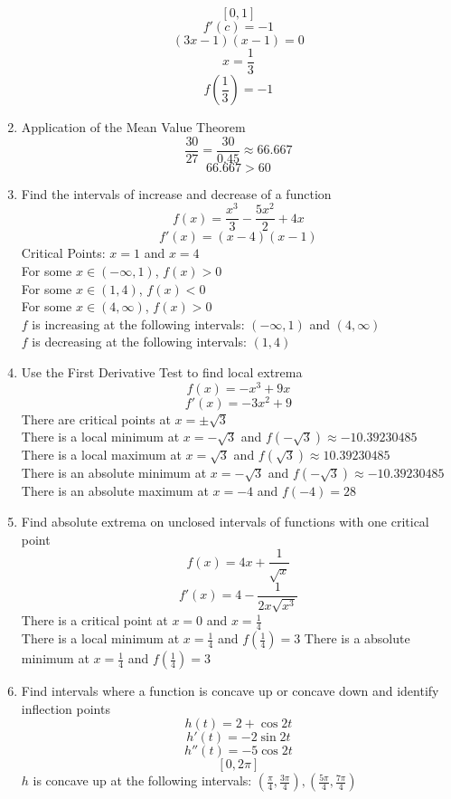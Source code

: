 \documentclass{article}
\begin{document}
\begin{enumerate}
    $$[0, 1]$$
    $$f'(c) = -1$$
    $$(3x - 1)(x - 1) = 0$$
    $$x = \frac{1}{3}$$
    $$f\left(\frac{1}{3}\right) = -1$$
    \item Application of the Mean Value Theorem
    $$\frac{30}{27} = \frac{30}{0.45} \approx 66.667$$
    $$66.667 > 60$$
    \item Find the intervals of increase and decrease of a function
    $$f(x) = \frac{x^3}{3} - \frac{5x^2}{2} + 4x$$
    $$f'(x) = \left(x - 4\right)\left(x - 1\right)$$
    Critical Points: $x = 1$ and $x = 4$ \\
    For some $x \in (-\infty, 1)$, $f(x) > 0$ \\
    For some $x \in (1, 4)$, $f(x) < 0$ \\
    For some $x \in (4, \infty)$, $f(x) > 0$ \\
    $f$ is increasing at the following intervals: $(-\infty, 1)$ and $(4, \infty)$ \\
    $f$ is decreasing at the following intervals: $(1, 4)$
    \item Use the First Derivative Test to find local extrema
    $$f(x) = -x^3 + 9x$$
    $$f'(x) = -3x^2 + 9$$
    There are critical points at $x = \pm \sqrt{3}$ \\
    There is a local minimum at $x = -\sqrt{3}$ and $f(-\sqrt{3}) \approx -10.39230485$ \\
    There is a local maximum at $x = \sqrt{3}$ and $f(\sqrt{3}) \approx 10.39230485$ \\
    There is an absolute minimum at $x = -\sqrt{3}$ and $f(-\sqrt{3}) \approx -10.39230485$ \\
    There is an absolute maximum at $x = -4$ and $f(-4) = 28$
    \item Find absolute extrema on unclosed intervals of functions with one critical point
    $$f(x) = 4x + \frac{1}{\sqrt{x}}$$
    $$f'(x) = 4 - \frac{1}{2x\sqrt{x^3}}$$
    There is a critical point at $x = 0$ and $x = \frac{1}{4}$ \\
    There is a local minimum at $x = \frac{1}{4}$ and $f\left(\frac{1}{4}\right) = 3$
    There is a absolute minimum at $x = \frac{1}{4}$ and $f\left(\frac{1}{4}\right) = 3$
    \item Find intervals where a function is concave up or concave down and identify inflection points
    $$h(t) = 2 + \cos{2t}$$
    $$h'(t) = -2\sin{2t}$$
    $$h''(t) = -5\cos{2t}$$
    $$[0, 2\pi]$$
    $h$ is concave up at the following intervals: $\left(\frac{\pi}{4}, \frac{3\pi}{4}\right), \left(\frac{5\pi}{4}, \frac{7\pi}{4}\right)$ \\

\end{enumerate}
\end{document}
